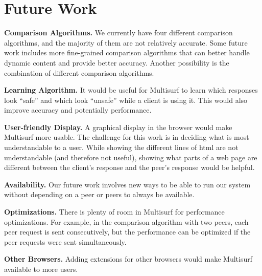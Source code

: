 \section{Future Work}
\label{sec:future}

{\bf Comparison Algorithms.} We currently have four different comparison algorithms, and the majority of them are not relatively accurate.  Some future work includes more fine-grained comparison algorithms that can better handle dynamic content and provide better accuracy.  Another possibility is the combination of different comparison algorithms.

{\bf Learning Algorithm.} It would be useful for Multisurf to learn which responses look ``safe'' and which look ``unsafe'' while a client is using it.  This would also improve accuracy and potentially performance.    

{\bf User-friendly Display.} A graphical display in the browser would make Multisurf more usable.  The challenge for this work is in deciding what is most understandable to a user.  While showing the different lines of html are not understandable (and therefore not useful), showing what parts of a web page are different between the client's response and the peer's response would be helpful.

{\bf Availability.} Our future work involves new ways to be able to run our system without depending on a peer or peers to always be available.  

{\bf Optimizations.} There is plenty of room in Multisurf for performance optimizations.  For example, in the comparison algorithm with two peers, each peer request is sent consecutively, but the performance can be optimized if the peer requests were sent simultaneously.  

{\bf Other Browsers.}  Adding extensions for other browsers would make Multisurf available to more users.
